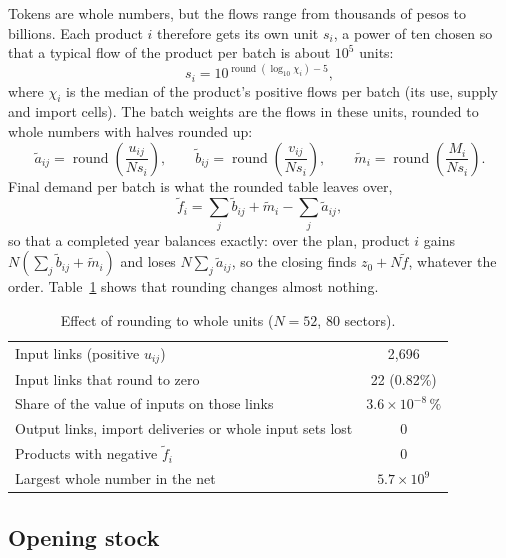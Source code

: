 \documentclass[11pt]{article}
\begin{document}
Tokens are whole numbers, but the flows range from thousands of pesos to billions. Each product $i$ therefore gets its own unit $s_i$, a power of ten chosen so that a typical flow of the product per batch is about $10^5$ units:
\begin{equation}
s_i=10^{\operatorname{round}(\log_{10}\chi_i)-5},
\end{equation}
where $\chi_i$ is the median of the product's positive flows per batch (its use, supply and import cells). The batch weights are the flows in these units, rounded to whole numbers with halves rounded up:
\begin{equation}
\tilde a_{ij}=\operatorname{round}\!\left(\frac{u_{ij}}{N s_i}\right),\qquad
\tilde b_{ij}=\operatorname{round}\!\left(\frac{v_{ij}}{N s_i}\right),\qquad
\tilde m_i=\operatorname{round}\!\left(\frac{M_i}{N s_i}\right).
\end{equation}
Final demand per batch is what the rounded table leaves over,
\begin{equation}
\tilde f_i=\textstyle\sum_j\tilde b_{ij}+\tilde m_i-\sum_j\tilde a_{ij},
\label{eq:balance}
\end{equation}
so that a completed year balances exactly: over the plan, product $i$ gains $N(\sum_j\tilde b_{ij}+\tilde m_i)$ and loses $N\sum_j\tilde a_{ij}$, so the closing finds $z_0+N\tilde f$, whatever the order. Table~\ref{tab:rounding} shows that rounding changes almost nothing.

\begin{table}[htbp]
\centering\small
\caption{Effect of rounding to whole units ($N=52$, 80 sectors).}
\label{tab:rounding}
\begin{tabular}{@{}lc@{}}
\toprule
Input links (positive $u_{ij}$) & 2{,}696\\
Input links that round to zero & 22 (0.82\%)\\
Share of the value of inputs on those links & $3.6\times10^{-8}\,\%$\\
Output links, import deliveries or whole input sets lost & 0\\
Products with negative $\tilde f_i$ & 0\\
Largest whole number in the net & $5.7\times10^{9}$\\
\bottomrule
\end{tabular}
\end{table}

\subsection{Opening stock}\label{sec:stock}
\end{document}
